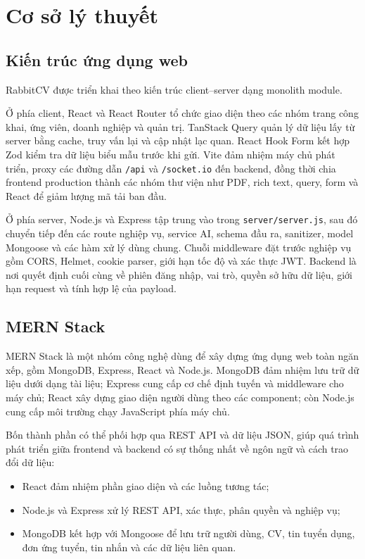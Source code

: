 \chapter{Cơ sở lý thuyết}

\section{Kiến trúc ứng dụng web}

RabbitCV được triển khai theo kiến trúc client--server dạng monolith module.

Ở phía client, React và React Router tổ chức giao diện theo các nhóm trang công khai, ứng viên, doanh nghiệp và quản trị. TanStack Query quản lý dữ liệu lấy từ server bằng cache, truy vấn lại và cập nhật lạc quan. React Hook Form kết hợp Zod kiểm tra dữ liệu biểu mẫu trước khi gửi. Vite đảm nhiệm máy chủ phát triển, proxy các đường dẫn \texttt{/api} và \texttt{/socket.io} đến backend, đồng thời chia frontend production thành các nhóm thư viện như PDF, rich text, query, form và React để giảm lượng mã tải ban đầu.

Ở phía server, Node.js và Express tập trung vào trong \texttt{server/server.js}, sau đó chuyển tiếp đến các route nghiệp vụ, service AI, schema đầu ra, sanitizer, model Mongoose và các hàm xử lý dùng chung. Chuỗi middleware đặt trước nghiệp vụ gồm CORS, Helmet, cookie parser, giới hạn tốc độ và xác thực JWT. Backend là nơi quyết định cuối cùng về phiên đăng nhập, vai trò, quyền sở hữu dữ liệu, giới hạn request và tính hợp lệ của payload.

\section{MERN Stack}

MERN Stack là một nhóm công nghệ dùng để xây dựng ứng dụng web toàn ngăn xếp, gồm MongoDB, Express, React và Node.js. MongoDB đảm nhiệm lưu trữ dữ liệu dưới dạng tài liệu; Express cung cấp cơ chế định tuyến và middleware cho máy chủ; React xây dựng giao diện người dùng theo các component; còn Node.js cung cấp môi trường chạy JavaScript phía máy chủ.

Bốn thành phần có thể phối hợp qua REST API và dữ liệu JSON, giúp quá trình phát triển giữa frontend và backend có sự thống nhất về ngôn ngữ và cách trao đổi dữ liệu:

\begin{itemize}
    \item React đảm nhiệm phần giao diện và các luồng tương tác;
    \item Node.js và Express xử lý REST API, xác thực, phân quyền và nghiệp vụ;
    \item MongoDB kết hợp với Mongoose để lưu trữ người dùng, CV, tin tuyển dụng, đơn ứng tuyển, tin nhắn và các dữ liệu liên quan.
\end{itemize}

